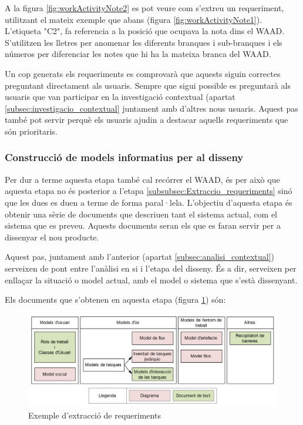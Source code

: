 A la figura \ref{fig:workActivityNote2} es pot veure com s'extreu un requeriment, utilitzant el mateix exemple que abans (figura \ref{fig:workActivityNote1}). L'etiqueta "C2", fa referencia a la posició que ocupava la nota dins el \ac{WAAD}. S'utilitzen les lletres per anomenar les diferents branques i sub-branques i els números per diferenciar les notes que hi ha la mateixa branca del \ac{WAAD}.

Un cop generats els requeriments es comprovarà que aquests siguin correctes preguntant directament als usuaris. Sempre que sigui possible es preguntarà als usuaris que van participar en la investigació contextual (apartat \ref{subsec:investigacio_contextual} juntament amb d'altres nous usuaris. Aquest pas també pot servir perquè els usuaris ajudin a destacar aquells requeriments que són prioritaris.

\subsubsection{Construcció de models informatius per al disseny}\label{subsubsec:Construccio_models}
Per dur a terme aquesta etapa també cal recórrer el \ac{WAAD}, és per això que aquesta etapa no és posterior a l'etapa \ref{subsubsec:Extraccio_requeriments} sinó que les dues es duen a terme de forma paral·lela. L'objectiu d'aquesta etapa és obtenir una sèrie de documents que descriuen tant el sistema actual, com el sistema que es preveu. Aquests documents seran els que es faran servir per a dissenyar el nou producte.

Aquest pas, juntament amb l'anterior (apartat \ref{subsec:analisi_contextual}) serveixen de pont entre l'anàlisi en si i l'etapa del disseny. És a dir, serveixen per enllaçar la situació o model actual, amb el model o sistema que s'està dissenyant.

Els documents que s'obtenen en aquesta etapa (figura \ref{fig:design-informing_models}) són: 
\begin{figure}[ht]
\centering
\includegraphics[scale=0.75]{Design-informing_models.png}
\caption{Exemple d'extracció de requeriments}\label{fig:design-informing_models}
\end{figure}

